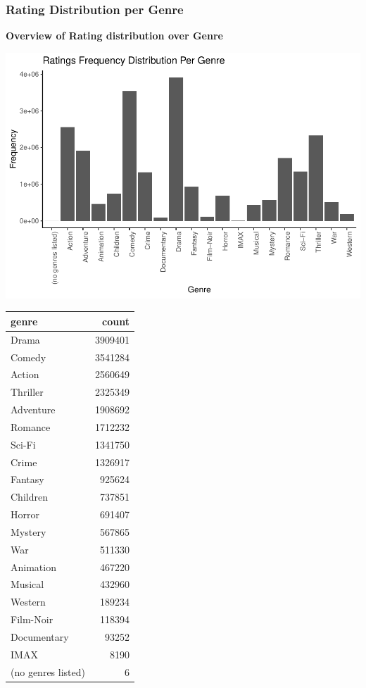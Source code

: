 \documentclass[
]{article}
\begin{document}
\hypertarget{rating-distribution-per-genre}{%
\subsubsection{Rating Distribution per
Genre}\label{rating-distribution-per-genre}}

\textbf{Overview of Rating distribution over Genre}

\begin{center}\includegraphics{MovieLens-Project-Report_files/figure-latex/unnamed-chunk-26-1} \end{center}

\begin{table}
\centering\begingroup\fontsize{10}{12}\selectfont

\begin{tabular}{l|r}
\hline
genre & count\\
\hline
Drama & 3909401\\
\hline
Comedy & 3541284\\
\hline
Action & 2560649\\
\hline
Thriller & 2325349\\
\hline
Adventure & 1908692\\
\hline
Romance & 1712232\\
\hline
Sci-Fi & 1341750\\
\hline
Crime & 1326917\\
\hline
Fantasy & 925624\\
\hline
Children & 737851\\
\hline
Horror & 691407\\
\hline
Mystery & 567865\\
\hline
War & 511330\\
\hline
Animation & 467220\\
\hline
Musical & 432960\\
\hline
Western & 189234\\
\hline
Film-Noir & 118394\\
\hline
Documentary & 93252\\
\hline
IMAX & 8190\\
\hline
(no genres listed) & 6\\
\hline
\end{tabular}
\endgroup{}
\end{table}
\end{document}
